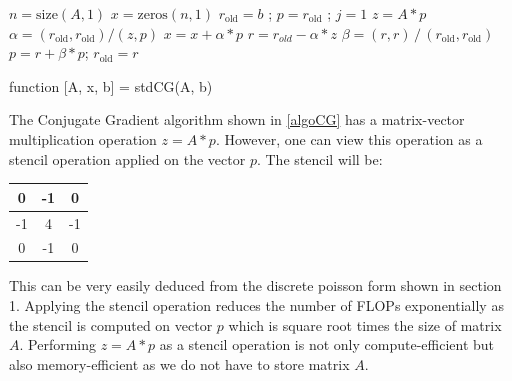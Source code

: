\documentclass{article}
\begin{document}
\begin{spacing}{1.1}
\begin{algorithm}[H]

\begin{algorithmic}[1]

\STATE $n = \text{size}(A,1)$ 
\STATE $x = \text{zeros}(n,1)$
\STATE $r_{\text{old}} = b$ ; $p = r_{\text{old}}$ ; $j = 1$
\STATE $z = A*p$ 
\STATE ${\alpha} = (r_{\text{old}}, r_{\text{old}})/(z, p)$
\STATE $x = x + \alpha * p$ 
\STATE $r = r_{old} - \alpha * z$
\STATE $\beta = (r, r) \, / \, (r_{\text{old}}, r_{\text{old}})$
\STATE $p = r + \beta* p$;
\STATE $r_{\text{old}} = r$
\ENDFOR
\end{algorithmic}
\caption{\label{algoCG} function [A, x, b] = stdCG(A, b)} 
\end{algorithm}

The Conjugate Gradient algorithm shown in \eqref{algoCG} has a matrix-vector multiplication operation $z=A*p$. However, one can view this operation as a stencil operation applied on the vector $p$. The stencil will be:
\begin{tabular}{|c|c|c|}
\hline
0 & -1 & 0\\ \hline
-1 & 4 & -1 \\ \hline
0 & -1 & 0 \\ \hline
\end{tabular}

This can be very easily deduced from the discrete poisson form shown in section 1.
Applying the stencil operation reduces the number of FLOPs exponentially as the stencil is computed on vector $p$ which is square root times the size of matrix $A$.
Performing $z=A*p$ as a stencil operation is not only compute-efficient but also memory-efficient as we do not have to store matrix $A$.


\end{spacing}
\end{document}
